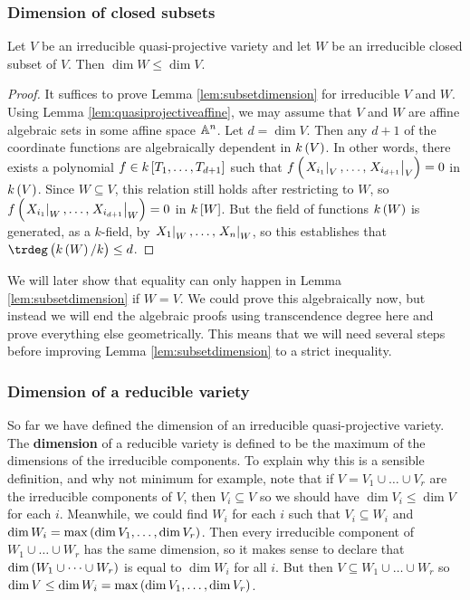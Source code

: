 \subsubsection{Dimension of closed subsets}

\begin{lemma}
\label{lem:subsetdimension}
Let $ V $ be an irreducible quasi-projective variety and let $ W $ be an irreducible closed subset of $ V $. Then $ \dim W \le \dim V $.
\end{lemma}

\begin{proof}
It suffices to prove Lemma \ref{lem:subsetdimension} for irreducible $ V $ and $ W $. Using Lemma \ref{lem:quasiprojectiveaffine}, we may assume that $ V $ and $ W $ are affine algebraic sets in some affine space $ \AA^n $. Let $ d = \dim V $. Then any $ d + 1 $ of the coordinate functions are algebraically dependent in $ k\br{V} $. In other words, there exists a polynomial $ f \in k\sbr{T_1, \dots, T_{d + 1}} $ such that $ f\br{\eval{X_{i_1}}_V, \dots, \eval{X_{i_{d + 1}}}_V} = 0 $ in $ k\br{V} $. Since $ W \subseteq V $, this relation still holds after restricting to $ W $, so $ f\br{\eval{X_{i_1}}_W, \dots, \eval{X_{i_{d + 1}}}_W} = 0 $ in $ k\sbr{W} $. But the field of functions $ k\br{W} $ is generated, as a $ k $-field, by $ \eval{X_1}_W, \dots, \eval{X_n}_W $, so this establishes that $ \trdeg\br{k\br{W} / k} \le d $.
\end{proof}

We will later show that equality can only happen in Lemma \ref{lem:subsetdimension} if $ W = V $. We could prove this algebraically now, but instead we will end the algebraic proofs using transcendence degree here and prove everything else geometrically. This means that we will need several steps before improving Lemma \ref{lem:subsetdimension} to a strict inequality.

\pagebreak

\subsubsection{Dimension of a reducible variety}

So far we have defined the dimension of an irreducible quasi-projective variety. The \textbf{dimension} of a reducible variety is defined to be the maximum of the dimensions of the irreducible components. To explain why this is a sensible definition, and why not minimum for example, note that if $ V = V_1 \cup \dots \cup V_r $ are the irreducible components of $ V $, then $ V_i \subseteq V $ so we should have $ \dim V_i \le \dim V $ for each $ i $. Meanwhile, we could find $ W_i $ for each $ i $ such that $ V_i \subseteq W_i $ and $ \dim W_i = \max\br{\dim V_1, \dots, \dim V_r} $. Then every irreducible component of $ W_1 \cup \dots \cup W_r $ has the same dimension, so it makes sense to declare that $ \dim\br{W_1 \cup \dots \cup W_r} $ is equal to $ \dim W_i $ for all $ i $. But then $ V \subseteq W_1 \cup \dots \cup W_r $ so $ \dim V \le \dim W_i = \max\br{\dim V_1, \dots, \dim V_r} $.

